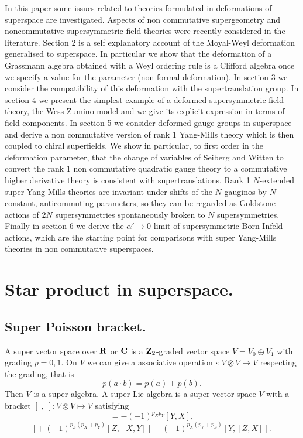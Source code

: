 \documentclass[a4paper,12pt]{article}
\begin{document}
In this paper some issues related to  theories formulated in 
deformations of superspace are investigated. Aspects of non commutative
supergeometry \cite{ cz,s}
 and noncommutative supersymmetric field theories \cite{cr, gp, ss}
were recently considered in the literature. Section 2 is  a
self explanatory
 account of the Moyal-Weyl deformation generalised to superspace. In
particular we
 show that the 
deformation of a Grassmann algebra obtained with a Weyl ordering rule is a
Clifford algebra once we specify a value for the parameter (non formal
deformation). 
In section 3 we consider the compatibility of this deformation with the
supertranslation
group. In section 4 we present the simplest example of a deformed
supersymmetric field
theory, the Wess-Zumino model and we give its explicit expression in terms
of field
components. In section 5 we consider deformed gauge groups in superspace
and derive a non 
commutative version of rank 1 Yang-Mills theory which is then coupled to
chiral superfields. 
We show in particular, to first  order in the deformation parameter,
 that the change of
variables of Seiberg and Witten
 \cite{sw} to convert the rank 1 non commutative quadratic gauge theory to
a commutative 
higher derivative theory is consistent with supertranslations. 
Rank 1 $N$-extended 
super Yang-Mills theories are invariant under shifts of the $N$  gauginos
by $N$ constant,
anticommuting parameters, so they  can be regarded as Goldstone actions of
$2N$
supersymmetries spontaneously broken to $N$ supersymmetries.
 Finally in section 6 we derive the $\alpha'\mapsto 0$ limit of
supersymmetric
Born-Infeld actions, which are the starting point for comparisons with 
super Yang-Mills theories in non commutative superspaces.





\section{Star product in superspace.}

\subsection{Super Poisson bracket.}

A super vector space over ${\bf R}$ or  ${\bf C}$ is a ${\bf Z}_2$-graded vector space 
$V=V_0\oplus V_1$ with 
grading $p=0,1$. On $V$ we can give a associative operation $\cdot
:V\otimes 
V\mapsto V$  respecting the grading, that is
$$
p(a\cdot b)=p(a)+p(b).
$$
Then $V$ is a super algebra. A super Lie algebra is a super vector space
$V$
 with a bracket $[\;,\;]:V\otimes V \mapsto V$ satisfying
\begin{equation}
[X,Y]=-(-1)^{p_Xp_Y}[Y,X],\label{sp}
\end{equation}
\begin{equation}
[X,[Y,Z]]+(-1)^{p_Z(p_X+p_Y)}[Z,[X,Y]]+(-1)^{p_X(p_Y+p_Z)}[Y,[Z,X]].
\label{ji}
\end{equation}
\end{document}
